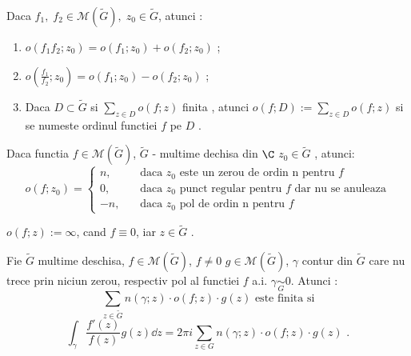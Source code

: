 \begin{theorem}
    Daca $f_1,\; f_2 \in \mathcal{M}(\widetilde{G}), \; z_0 \in \widetilde{G}$, atunci :
    \begin{enumerate}
        \item $ o (f_1 f_2; z_0) = o(f_1; z_0) + o(f_2; z_0)$ ;
        \item $\displaystyle o \left( \frac{f_1}{f_2} ; z_0\right) = o(f_1;z_0) - o(f_2;z_0)$ ;
        \item Daca $D \subset \widetilde{G}$ si $\displaystyle \sum_{z \in D} o(f;z)$ finita ,
            atunci $\displaystyle o(f;D) := \sum_{z \in D} o(f;z) $  si se numeste ordinul
            functiei $f$ pe $D$ .
    \end{enumerate}

    Daca functia $f \in \mathcal{M}(\widetilde{G})$, $\widetilde{G}$ - multime dechisa din $\C$
    $z_0 \in \widetilde{G}$ , atunci:
    \[
        o(f;z_0) =
            \left \{
            \begin{aligned}
                 n \text{,} && \text{ daca } z_0 \text{ este un zerou de ordin n pentru } f \\
                 0 \text{,} &&\text{ daca } z_0 \text{ punct regular pentru } f \text { dar nu se anuleaza}\\
                -n \text{,} &&\text{ daca } z_0 \text{ pol de ordin n pentru } f
            \end{aligned}
           \right.
    \]
\end{theorem}

\begin{definition}
    $o(f;z) := \infty$, cand $f \equiv 0$, iar $z \in \widetilde{G}$ .
\end{definition}

\begin{theorem}
    Fie $\widetilde{G}$ multime deschisa, $f \in \mathcal{M}(\widetilde{G})$, $f \neq 0$
    $g \in \mathcal{M}(\widetilde{G})$, $\gamma$ contur din $\widetilde{G}$ care nu trece
    prin niciun zerou, respectiv pol al functiei $f$ a.i. $\gamma \underset{G}{\sim} 0$.
    Atunci : 
    \[
        \sum_{z \in \widetilde{G}} n(\gamma;z)\cdot o(f;z) \cdot g(z)  \text{ este finita si}
    \]
    \[
        \int_{\gamma} \frac{f'(z)}{f(z)} g(z) \dd z = 2 \pi i \sum_{z \in G} n(\gamma;z) \cdot o(f;z) \cdot g(z) \text{  .}
    \]
\end{theorem}